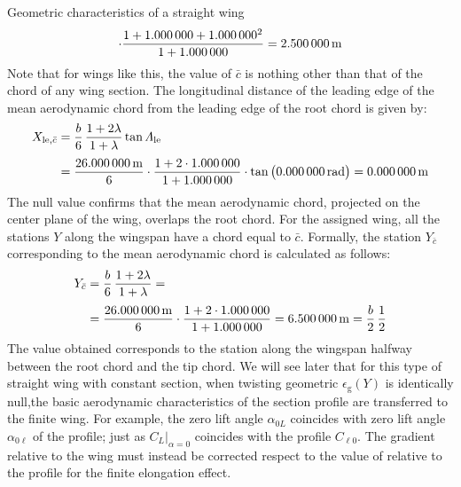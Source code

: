 \documentclass[[12pt,twoside]{book}
\begin{document}
\begin{myExampleX}{Geometric characteristics of a straight wing}{}
\[\begin{split}
      \cdot 
        \frac{
          1 + \SI[round-precision=0]{\myTaperRatioWing}{} + \SI[round-precision=0]{\myTaperRatioWing}{}^2
        }{
          1 + \SI[round-precision=0]{\myTaperRatioWing}{}
        }
    = \SI[round-precision=2]{\myMACWingMT}{\metre} 
\end{split}
\]
Note that for wings like this, the value of $\bar{c} $ is nothing other than that of the chord of any wing section.
\noindent
The longitudinal distance of the leading edge of the mean aerodynamic chord from the leading edge of the root chord is given by:
\[
\begin{split}
X_{\mathrm{le},\bar{c}} 
  & {}=
    \frac{b}{6} \, \frac{1+2\lambda}{1+\lambda} \tan\Lambda_\mathrm{le} \\[3pt]
  & {}=
    \frac{\SI[round-precision=1]{\mySpanWingMT}{\metre}}{6}
      \cdot 
      \frac{
        1 + 2\cdot\SI[round-precision=0]{\myTaperRatioWing}{}
      }{
        1 + \SI[round-precision=0]{\myTaperRatioWing}{}
      }
      \cdot \tan \big( \SI[round-precision=0]{\myLambdaLERad}{\radian} \big)
    = { \SI[round-precision=0]{\myXLEMACWingMT}{\metre} }%
\end{split}
\]
The null value confirms that the mean aerodynamic chord, projected on the center plane of the wing, overlaps the root chord.
\noindent
For the assigned wing, all the stations $Y$ along the wingspan have a chord equal to $\bar{c}$. Formally, the station $Y_{\bar{c}}$ corresponding to the mean aerodynamic chord is calculated as follows:
\[
\begin{split}
Y_{\bar{c}} 
  & {}=
    \frac{b}{6} \, \frac{1+2\lambda}{1+\lambda} = \\[3pt]
  & {}=
    \frac{\SI[round-precision=1]{\mySpanWingMT}{\metre}}{6}
      \cdot 
      \frac{
        1 + 2\cdot\SI[round-precision=2]{\myTaperRatioWing}{}
      }{
        1 + \SI[round-precision=2]{\myTaperRatioWing}{}
      }
    = { \SI[round-precision=2]{\myYMACWingMT}{\metre} }
    = \frac{b}{2} \, \frac{1}{2}
\end{split}
\]
The value obtained corresponds to the station along the wingspan halfway between the root chord and the tip chord. We will see later that for this type of straight wing with constant section, when twisting geometric $\epsilon_\mathrm{g}(Y)$ is identically null,the basic aerodynamic characteristics of the section profile are transferred to the finite wing. For example, the zero lift angle $\alpha_{0L}$ coincides with  zero lift angle $\alpha_{0\ell}$ of the profile; just as $C_L \big|_{\alpha = 0} $ coincides with the profile $C_{\ell 0}$. The gradient  relative to the wing must instead be corrected respect to the value of  relative to the profile for the finite elongation effect.
\end{myExampleX}
\end{document}
